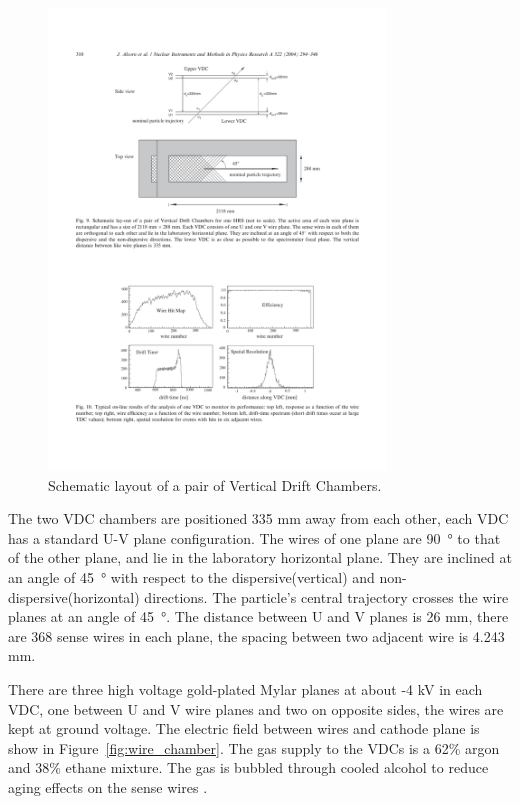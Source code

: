 \begin{figure}[tb!]
\centering
\includegraphics[width=0.8\textwidth]{figs/VDC.pdf}
\caption[Schematic layout of Vertical Drift Chambers]{Schematic layout of a pair of Vertical Drift Chambers.
\label{fig:VDC_layout}}
\end{figure}

The two VDC chambers are positioned 335 mm away from each other, each VDC has a standard U-V plane configuration.
The wires of one plane are \SI{90}{\degree} to that of the other plane, and lie in the laboratory horizontal plane.
They are inclined at an angle of \SI{45}{\degree} with respect to the dispersive(vertical) and non-dispersive(horizontal) directions.
The particle's central trajectory crosses the wire planes at an angle of \SI{45}{\degree}.
The distance between U and V planes is 26 mm, there are 368 sense wires in each plane, the spacing between two
adjacent wire is 4.243 mm.

There are three high voltage gold-plated Mylar planes at about -4 kV in each VDC, one between U and V wire planes and two on opposite
sides, the wires are kept at ground voltage. The electric field between wires and cathode plane is show in Figure~\ref{fig:wire_chamber}.
The gas supply to the VDCs is a 62\% argon and 38\% ethane mixture. The gas is bubbled through cooled alcohol to reduce
aging effects on the sense wires \cite{Alcorn2004}. 

